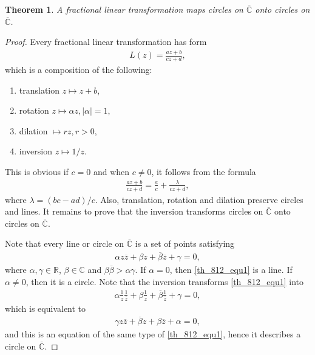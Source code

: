 \documentclass[11pt]{book}
\newtheorem{theorem}{Theorem}[chapter]
\theoremstyle{definition}
\numberwithin{equation}{chapter}
\begin{document}
\begin{theorem}
A fractional linear transformation maps circles on $\overline{\mathbb{C}}$ onto circles on $\overline{\mathbb{C}}$.
\end{theorem}
\begin{proof}
Every fractional linear transformation has form
\begin{align*}
    L(z) = \frac{az + b}{cz + d},
\end{align*}
which is a composition of the following:
\begin{enumerate}[label=(\alph*)]
    \item translation $z \mapsto z + b$, 
    
    \item rotation $z \mapsto \alpha z, \left|\alpha\right| = 1$,
    
    \item dilation $ \mapsto rz, r > 0$, 
    
    \item inversion $z \mapsto 1/z$.
\end{enumerate}
This is obvious if $c = 0$ and when $c \neq 0$, it follows from the formula
\begin{align*}
    \frac{az + b}{cz + d} = \frac{a}{c} + \frac{\lambda}{cz + d},
\end{align*}
where $\lambda = (bc - ad)/c$. Also, translation, rotation and dilation preserve circles and lines. It remains to prove that the inversion transforms circles on $\overline{\mathbb{C}}$ onto circles on $\overline{\mathbb{C}}$. 

Note that every line or circle on $\overline{\mathbb{C}}$ is a set of points satisfying 
\begin{align}\label{th_812_equ1}
    \alpha z \overline{z} + \beta z + \overline{\beta} \overline{z} + \gamma = 0,
\end{align}
where $\alpha, \gamma \in \mathbb{R}$, $\beta \in \mathbb{C}$ and $\beta \overline{\beta} > \alpha \gamma$. If $\alpha = 0$, then \eqref{th_812_equ1} is a line. If $\alpha \neq 0$, then it is a circle. Note that the inversion transforms \eqref{th_812_equ1} into
\begin{align*}
    \alpha \frac{1}{z} \frac{1}{\overline{z}} + \beta \frac{1}{z} + \overline{\beta} \frac{1}{\overline{z}} + \gamma = 0,
\end{align*}
which is equivalent to
\begin{align}\label{th_812_equ2}
    \gamma z \overline{z} + \overline{\beta} z + \beta \overline{z} + \alpha = 0,
\end{align}
and this is an equation of the same type of \eqref{th_812_equ1}, hence it describes a circle on $\overline{\mathbb{C}}$.
\end{proof}
\end{document}
